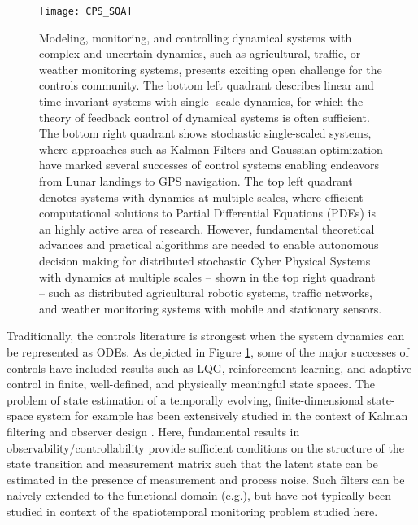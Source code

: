 \begin{figure}[h] %
	\centering
	\texttt{[image: CPS\_SOA]}
		\caption{Modeling, monitoring, and controlling dynamical systems with complex and uncertain dynamics, such as agricultural, traffic, or weather monitoring systems, presents exciting open challenge for the controls community. The bottom left quadrant describes linear and time-invariant systems with single- scale dynamics, for which the theory of feedback control of dynamical systems is often sufficient. The bottom right quadrant shows stochastic single-scaled systems, where approaches such as Kalman Filters and Gaussian optimization have marked several successes of control systems enabling endeavors from Lunar landings to GPS navigation. The top left quadrant denotes systems with dynamics at multiple scales, where efficient computational solutions to Partial Differential Equations (PDEs) is an highly active area of research. However, fundamental theoretical advances and practical algorithms are needed to enable autonomous decision making for distributed stochastic Cyber Physical Systems with dynamics at multiple scales – shown in the top right quadrant – such as distributed agricultural robotic systems, traffic networks, and weather monitoring systems with mobile and stationary sensors.}
	\label{fig:cps_soa}
\end{figure}
  
Traditionally, the controls literature is strongest when the system dynamics can be represented as ODEs. %
As depicted in Figure \ref{fig:cps_soa}, some of the major successes of controls have included results such as LQG, reinforcement learning, and adaptive control in finite, well-defined, and physically meaningful state spaces. The problem of state estimation of a temporally evolving, finite-dimensional state-space system for example has been extensively studied in the context of Kalman filtering and observer design \cite{Gelb74}. Here, fundamental results in observability/controllability provide sufficient conditions on the structure of the state transition and measurement matrix such that the latent state can be estimated in the presence of measurement and process noise. %
Such filters can be naively extended to the functional domain (e.g.\cite{mardia1998kriged}), but have not typically been studied in context of the spatiotemporal monitoring problem studied here.  


